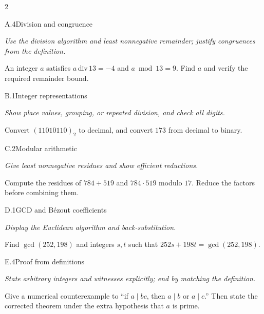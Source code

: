 \documentclass[9pt]{extarticle}
\begin{document}
\begin{multicols}{2}
\begin{CoreProblem}{A.4}{Division and congruence}
{\scriptsize\textit{Use the division algorithm and least nonnegative remainder; justify congruences from the definition.}\par}
An integer $a$ satisfies $a\,\mathrm{div}\,13=-4$ and $a\bmod13=9$.
Find $a$ and verify the required remainder bound.
\end{CoreProblem}
\begin{CoreProblem}{B.1}{Integer representations}
{\scriptsize\textit{Show place values, grouping, or repeated division, and check all digits.}\par}
Convert $(11010110)_2$ to decimal, and convert $173$ from decimal to binary.
\end{CoreProblem}
\begin{CoreProblem}{C.2}{Modular arithmetic}
{\scriptsize\textit{Give least nonnegative residues and show efficient reductions.}\par}
Compute the residues of $784+519$ and $784\cdot519$ modulo $17$. Reduce the
factors before combining them.
\end{CoreProblem}
\columnbreak
\begin{CoreProblem}{D.1}{GCD and B\'ezout coefficients}
{\scriptsize\textit{Display the Euclidean algorithm and back-substitution.}\par}
Find $\gcd(252,198)$ and integers $s,t$ such that
$252s+198t=\gcd(252,198)$.
\end{CoreProblem}
\begin{CoreProblem}{E.4}{Proof from definitions}
{\scriptsize\textit{State arbitrary integers and witnesses explicitly; end by matching the definition.}\par}
Give a numerical counterexample to ``if $a\mid bc$, then $a\mid b$ or
$a\mid c$.'' Then state the corrected theorem under the extra hypothesis that
$a$ is prime.
\end{CoreProblem}
\end{multicols}
\CoreWorkArea
\FormBreak
{}
\end{document}
